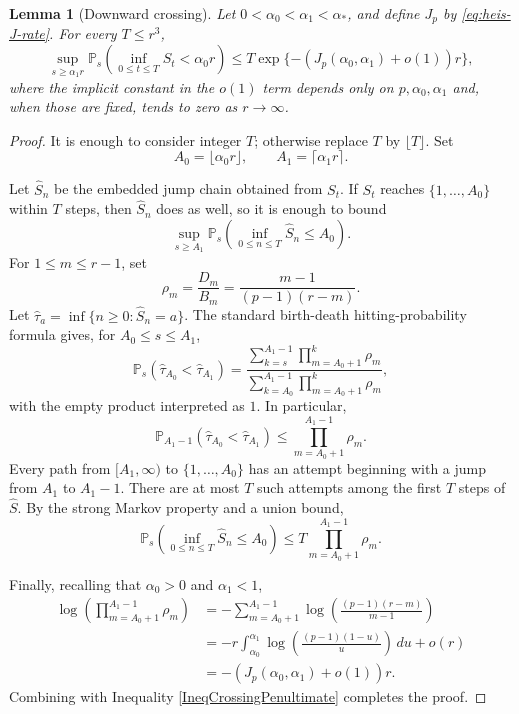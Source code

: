 \documentclass[11pt, reqno]{amsart}
\numberwithin{equation}{section}
\newtheorem{lemma}[theorem]{Lemma}
\newcommand{\Prob}{\mathbb P}
\begin{document}
\begin{lemma}[Downward crossing]\label{lem:heis-downward-crossing}
Let \(0<\alpha_0<\alpha_1<\alpha_*\), and define \(J_p\) by
\eqref{eq:heis-J-rate}.  For every \(T\le r^3\),
\[
    \sup_{s\ge\alpha_1 r}
    \Prob_s\left(\inf_{0\le t\le T}S_t<\alpha_0 r\right)
    \le T\exp\{-(J_p(\alpha_0,\alpha_1)+o(1))r\},
\]
where the implicit constant in the \(o(1)\) term depends only on \(p,\alpha_0,\alpha_1\) and, when those are fixed, tends to zero as
\(r\to\infty\).
\end{lemma}

\begin{proof}
It is enough to consider integer \(T\); otherwise replace \(T\) by
\(\lfloor T\rfloor\).  Set
\[
    A_0=\lfloor \alpha_0 r\rfloor,
    \qquad
    A_1=\lceil \alpha_1 r\rceil .
\]

Let \(\widehat S_n\) be the embedded jump chain obtained from \(S_t\). If \(S_t\) reaches \(\{1,\ldots,A_0\}\) within \(T\) steps, then \(\widehat S_n\) does as well, so it is enough to bound
\[
    \sup_{s\ge A_1}
    \Prob_s\left(\inf_{0\le n\le T}\widehat S_n\le A_0\right).
\]
For \(1\le m\le r-1\), set
\[
    \rho_m=\frac{D_m}{B_m}
    =
    \frac{m-1}{(p-1)(r-m)}.
\]
Let \(\widehat\tau_a=\inf\{n\ge0:\widehat S_n=a\}\).  The standard
birth-death hitting-probability formula gives, for \(A_0\le s\le A_1\),
\[
    \Prob_s(\widehat\tau_{A_0}<\widehat\tau_{A_1})
    =
    \frac{
        \sum_{k=s}^{A_1-1}\prod_{m=A_0+1}^k\rho_m
    }{
        \sum_{k=A_0}^{A_1-1}\prod_{m=A_0+1}^k\rho_m
    },
\]
with the empty product interpreted as \(1\).  In particular,
\[
    \Prob_{A_1-1}(\widehat\tau_{A_0}<\widehat\tau_{A_1})
    \le
    \prod_{m=A_0+1}^{A_1-1}\rho_m .
\]
Every path from \([A_1,\infty)\) to \(\{1,\ldots,A_0\}\) has an attempt
beginning with a jump from \(A_1\) to \(A_1-1\).  There are at most \(T\)
such attempts among the first \(T\) steps of \(\widehat S\).  By the strong Markov property and a union bound,
\begin{equation} \label{IneqCrossingPenultimate}
    \Prob_s\left(\inf_{0\le n\le T}\widehat S_n\le A_0\right)
    \le
    T\prod_{m=A_0+1}^{A_1-1}\rho_m .
\end{equation}

Finally, recalling that $\alpha_{0}>0$ and $\alpha_{1} < 1$,
\[
\begin{aligned}
 \log\left(\prod_{m=A_0+1}^{A_1-1}\rho_m\right) 
    &=
    -\sum_{m=A_0+1}^{A_1-1}
    \log\left(\frac{(p-1)(r-m)}{m-1}\right)  \\
    &=
    -r\int_{\alpha_0}^{\alpha_1}
    \log\left(\frac{(p-1)(1-u)}{u}\right)\,du+o(r)  \\
    &=
    -(J_p(\alpha_0,\alpha_1)+o(1))r .
\end{aligned}
\]
Combining with Inequality \eqref{IneqCrossingPenultimate}  completes the proof.
\end{proof}
\end{document}
